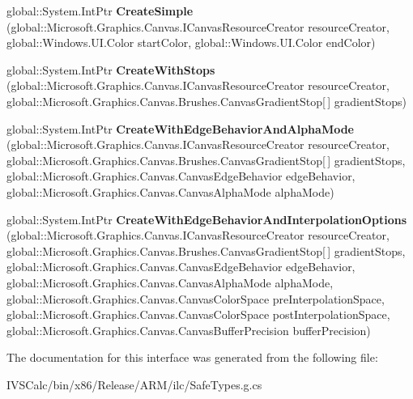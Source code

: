 \begin{DoxyCompactItemize}
\item 
\mbox{\label{interface_microsoft_1_1_graphics_1_1_canvas_1_1_brushes_1_1_i_canvas_radial_gradient_brush_factory_a6861e2be6484e9f7f56a0cc1d83ca34c}} 
global\+::\+System.\+Int\+Ptr {\bfseries Create\+Simple} (global\+::\+Microsoft.\+Graphics.\+Canvas.\+I\+Canvas\+Resource\+Creator resource\+Creator, global\+::\+Windows.\+U\+I.\+Color start\+Color, global\+::\+Windows.\+U\+I.\+Color end\+Color)
\item 
\mbox{\label{interface_microsoft_1_1_graphics_1_1_canvas_1_1_brushes_1_1_i_canvas_radial_gradient_brush_factory_afc3f3252c0427106726cd1a4505083e6}} 
global\+::\+System.\+Int\+Ptr {\bfseries Create\+With\+Stops} (global\+::\+Microsoft.\+Graphics.\+Canvas.\+I\+Canvas\+Resource\+Creator resource\+Creator, global\+::\+Microsoft.\+Graphics.\+Canvas.\+Brushes.\+Canvas\+Gradient\+Stop\mbox{[}$\,$\mbox{]} gradient\+Stops)
\item 
\mbox{\label{interface_microsoft_1_1_graphics_1_1_canvas_1_1_brushes_1_1_i_canvas_radial_gradient_brush_factory_a1c2661a56e5f23c59af42855da35b8d9}} 
global\+::\+System.\+Int\+Ptr {\bfseries Create\+With\+Edge\+Behavior\+And\+Alpha\+Mode} (global\+::\+Microsoft.\+Graphics.\+Canvas.\+I\+Canvas\+Resource\+Creator resource\+Creator, global\+::\+Microsoft.\+Graphics.\+Canvas.\+Brushes.\+Canvas\+Gradient\+Stop\mbox{[}$\,$\mbox{]} gradient\+Stops, global\+::\+Microsoft.\+Graphics.\+Canvas.\+Canvas\+Edge\+Behavior edge\+Behavior, global\+::\+Microsoft.\+Graphics.\+Canvas.\+Canvas\+Alpha\+Mode alpha\+Mode)
\item 
\mbox{\label{interface_microsoft_1_1_graphics_1_1_canvas_1_1_brushes_1_1_i_canvas_radial_gradient_brush_factory_aac0f3cc49f1ab7fde8ab93a987bb9d2a}} 
global\+::\+System.\+Int\+Ptr {\bfseries Create\+With\+Edge\+Behavior\+And\+Interpolation\+Options} (global\+::\+Microsoft.\+Graphics.\+Canvas.\+I\+Canvas\+Resource\+Creator resource\+Creator, global\+::\+Microsoft.\+Graphics.\+Canvas.\+Brushes.\+Canvas\+Gradient\+Stop\mbox{[}$\,$\mbox{]} gradient\+Stops, global\+::\+Microsoft.\+Graphics.\+Canvas.\+Canvas\+Edge\+Behavior edge\+Behavior, global\+::\+Microsoft.\+Graphics.\+Canvas.\+Canvas\+Alpha\+Mode alpha\+Mode, global\+::\+Microsoft.\+Graphics.\+Canvas.\+Canvas\+Color\+Space pre\+Interpolation\+Space, global\+::\+Microsoft.\+Graphics.\+Canvas.\+Canvas\+Color\+Space post\+Interpolation\+Space, global\+::\+Microsoft.\+Graphics.\+Canvas.\+Canvas\+Buffer\+Precision buffer\+Precision)
\end{DoxyCompactItemize}


The documentation for this interface was generated from the following file\+:\begin{DoxyCompactItemize}
\item 
I\+V\+S\+Calc/bin/x86/\+Release/\+A\+R\+M/ilc/Safe\+Types.\+g.\+cs\end{DoxyCompactItemize}
